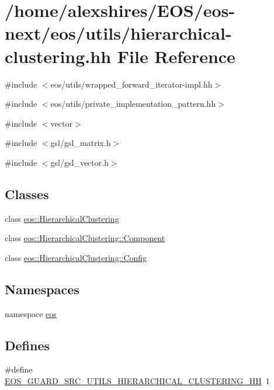 \hypertarget{hierarchical-clustering_8hh}{
\section{/home/alexshires/EOS/eos-\/next/eos/utils/hierarchical-\/clustering.hh File Reference}
\label{hierarchical-clustering_8hh}
}
{\ttfamily \#include $<$eos/utils/wrapped\_\-forward\_\-iterator-\/impl.hh$>$}\par
{\ttfamily \#include $<$eos/utils/private\_\-implementation\_\-pattern.hh$>$}\par
{\ttfamily \#include $<$vector$>$}\par
{\ttfamily \#include $<$gsl/gsl\_\-matrix.h$>$}\par
{\ttfamily \#include $<$gsl/gsl\_\-vector.h$>$}\par
\subsection*{Classes}
\begin{DoxyCompactItemize}
\item 
class \hyperlink{classeos_1_1HierarchicalClustering}{eos::HierarchicalClustering}
\item 
class \hyperlink{classeos_1_1HierarchicalClustering_1_1Component}{eos::HierarchicalClustering::Component}
\item 
class \hyperlink{classeos_1_1HierarchicalClustering_1_1Config}{eos::HierarchicalClustering::Config}
\end{DoxyCompactItemize}
\subsection*{Namespaces}
\begin{DoxyCompactItemize}
\item 
namespace \hyperlink{namespaceeos}{eos}
\end{DoxyCompactItemize}
\subsection*{Defines}
\begin{DoxyCompactItemize}
\item 
\#define \hyperlink{hierarchical-clustering_8hh_a1d869f2ababc1f554edea4a220d22a62}{EOS\_\-GUARD\_\-SRC\_\-UTILS\_\-HIERARCHICAL\_\-CLUSTERING\_\-HH}~1
\end{DoxyCompactItemize}

